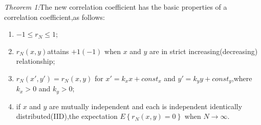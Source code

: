 \documentclass[journal]{IEEEtran}
\begin{document}
    \emph{Theorem 1:}The new correlation coefficient has the basic properties of a correlation coefficient,as follows:
    \begin{enumerate}
      \item $-1\leq r_{N}\leq 1$;
      \item $r_{N}(x,y)$attains $+1(-1)$ when $x$ and $y$ are in strict increasing(decreasing) relationship;
      \item $r_{N}({x}',{y}')=r_{N}(x,y)$ for ${x}'=k_{x}x+const_{x}$ and ${y}'=k_{y}y+const_{y}$,where $k_{x}> 0$ and $k_{y}> 0$;
      \item if $x$ and $y$ are mutually independent and each is independent identically distributed(IID),the expectation $E\left \{  r_{N}(x,y)=0 \right \}  $ when $N\rightarrow \infty  $.
    \end{enumerate}
\end{document}
